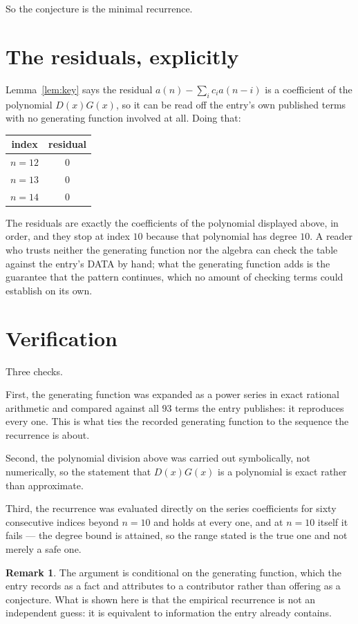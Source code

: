 \documentclass[11pt,a4paper]{article}
\theoremstyle{plain}
\theoremstyle{definition}
\newtheorem{remark}[theorem]{Remark}
\begin{document}
So the conjecture is the minimal recurrence.

\section{The residuals, explicitly}

Lemma~\ref{lem:key} says the residual $a(n)-\sum_ic_ia(n-i)$ is a coefficient of the
polynomial $D(x)G(x)$, so it can be read off the entry's own published terms with no
generating function involved at all. Doing that:
\begin{center}
\begin{tabular}{cc}
index & residual \\ \hline
$n=12$ & $0$ \\
$n=13$ & $0$ \\
$n=14$ & $0$
\end{tabular}
\end{center}
The residuals are exactly the coefficients of the polynomial displayed above, in order, and
they stop at index $10$ because that polynomial has degree $10$. A reader who trusts
neither the generating function nor the algebra can check the table against the entry's DATA
by hand; what the generating function adds is the guarantee that the pattern continues, which
no amount of checking terms could establish on its own.

\section{Verification}

Three checks.

First, the generating function was expanded as a power series in exact rational arithmetic and
compared against all $93$ terms the entry publishes: it reproduces every one. This is
what ties the recorded generating function to the sequence the recurrence is about.

Second, the polynomial division above was carried out symbolically, not numerically, so the
statement that $D(x)G(x)$ is a polynomial is exact rather than approximate.

Third, the recurrence was evaluated directly on the series coefficients for sixty consecutive
indices beyond $n=10$ and holds at every one, and at $n=10$ itself it fails --- the
degree bound is attained, so the range stated is the true one and not merely a safe one.

\begin{remark}
The argument is conditional on the generating function, which the entry records as a fact and
attributes to a contributor rather than offering as a conjecture. What is shown here is that
the empirical recurrence is not an independent guess: it is equivalent to information the
entry already contains.
\end{remark}
\end{document}
